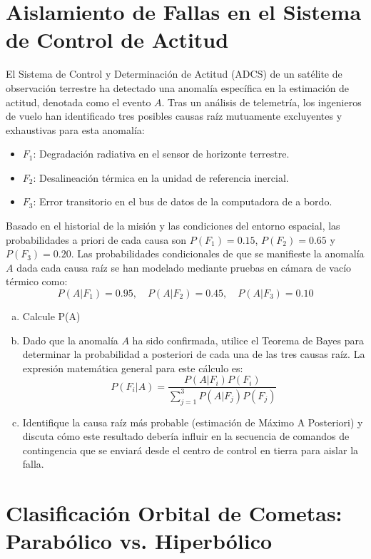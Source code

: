 \documentclass[a4paper]{article}
\begin{document}
\section{Aislamiento de Fallas en el Sistema de Control de Actitud}
\label{sec:problema-22}

El Sistema de Control y Determinación de Actitud (ADCS) de un satélite de observación terrestre ha detectado una anomalía específica en la estimación de actitud, denotada como el evento $A$. Tras un análisis de telemetría, los ingenieros de vuelo han identificado tres posibles causas raíz mutuamente excluyentes y exhaustivas para esta anomalía:

\begin{itemize}
\item $F_1$: Degradación radiativa en el sensor de horizonte terrestre.
\item $F_2$: Desalineación térmica en la unidad de referencia inercial.
\item $F_3$: Error transitorio en el bus de datos de la computadora de a bordo.
\end{itemize}

Basado en el historial de la misión y las condiciones del entorno espacial, las probabilidades a priori de cada causa son $P(F_1) = 0.15$, $P(F_2) = 0.65$ y $P(F_3) = 0.20$. Las probabilidades condicionales de que se manifieste la anomalía $A$ dada cada causa raíz se han modelado mediante pruebas en cámara de vacío térmico como:
$$
P(A|F_1) = 0.95, \quad P(A|F_2) = 0.45, \quad P(A|F_3) = 0.10
$$

\begin{enumerate}[a)]
\item Calcule P(A)
\item Dado que la anomalía $A$ ha sido confirmada, utilice el Teorema de Bayes para determinar la probabilidad a posteriori de cada una de las tres causas raíz. La expresión matemática general para este cálculo es:
$$
P(F_i|A) = \frac{P(A|F_i)P(F_i)}{\sum_{j=1}^{3} P(A|F_j)P(F_j)}
$$
\item Identifique la causa raíz más probable (estimación de Máximo A Posteriori) y discuta cómo este resultado debería influir en la secuencia de comandos de contingencia que se enviará desde el centro de control en tierra para aislar la falla.
\end{enumerate}

\section{Clasificación Orbital de Cometas: Parabólico vs. Hiperbólico}
\label{sec:problema-23}
\end{document}
